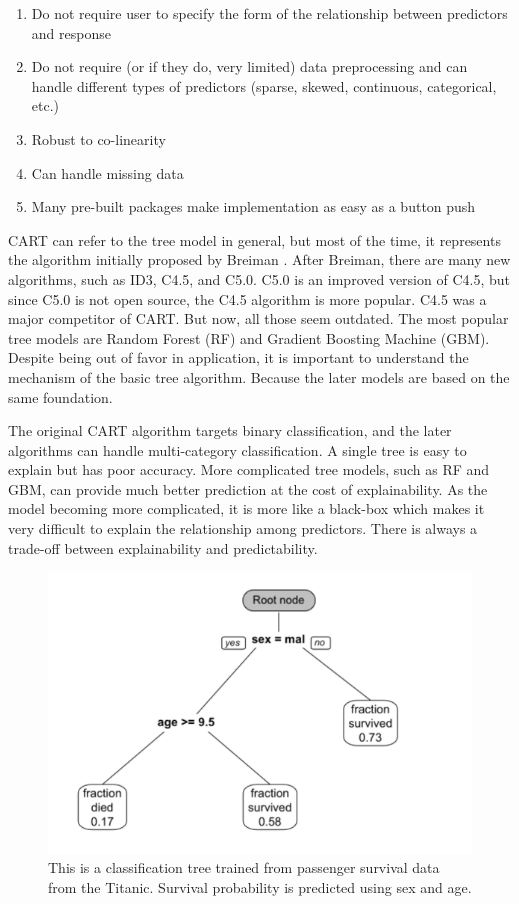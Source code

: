 \documentclass[
  12pt,
]{krantz}
\providecommand{\tightlist}{%
  \setlength{\itemsep}{0pt}\setlength{\parskip}{0pt}}
\begin{document}
\begin{enumerate}
\def\labelenumi{\arabic{enumi}.}
\tightlist
\item
  Do not require user to specify the form of the relationship between predictors and response
\item
  Do not require (or if they do, very limited) data preprocessing and can handle different types of predictors (sparse, skewed, continuous, categorical, etc.)
\item
  Robust to co-linearity
\item
  Can handle missing data
\item
  Many pre-built packages make implementation as easy as a button push
\end{enumerate}

CART can refer to the tree model in general, but most of the time, it represents the algorithm initially proposed by Breiman \citep{Breiman1984}. After Breiman, there are many new algorithms, such as ID3, C4.5, and C5.0. C5.0 is an improved version of C4.5, but since C5.0 is not open source, the C4.5 algorithm is more popular. C4.5 was a major competitor of CART. But now, all those seem outdated. The most popular tree models are Random Forest (RF) and Gradient Boosting Machine (GBM). Despite being out of favor in application, it is important to understand the mechanism of the basic tree algorithm. Because the later models are based on the same foundation.

The original CART algorithm targets binary classification, and the later algorithms can handle multi-category classification. A single tree is easy to explain but has poor accuracy. More complicated tree models, such as RF and GBM, can provide much better prediction at the cost of explainability. As the model becoming more complicated, it is more like a black-box which makes it very difficult to explain the relationship among predictors. There is always a trade-off between explainability and predictability.

\begin{figure}

{\centering \includegraphics[width=0.8\linewidth]{images/treeEN} 

}

\caption{This is a classification tree trained from passenger survival data from the Titanic.  Survival probability is predicted using sex and age.}\label{fig:treeexample}
\end{figure}
\end{document}
